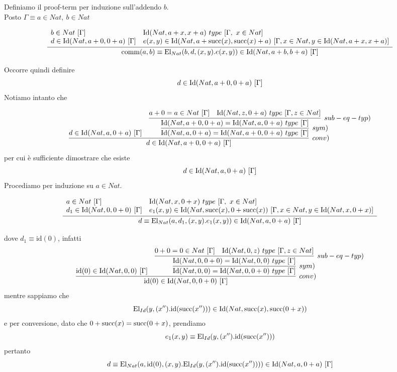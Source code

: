 Definiamo il proof-term per induzione sull'addendo $b$.\\
Posto $\Gamma \equiv a\in Nat,\ b\in Nat$

\begin{scriptsize}
	\[ \infer{\mathrm{comm}(a, b) \equiv \mathrm{El}_{Nat}(b, d, (x, y).e(x,y)) \in \Id{Nat}{a+b}{b+a}\ [\Gamma]}{\begin{array}{ll} b\in Nat\ [\Gamma] & \Id{Nat}{a+x}{x+a}\ type\ [\Gamma,\ x\in Nat] \\ d\in \Id{Nat}{a+0}{0+a}\ [\Gamma] & e(x, y)\in \Id{Nat}{a+\suc{x}}{\suc{x}+a}\ [\Gamma, x\in Nat, y\in \Id{Nat}{a+x}{x+a}]\end{array}} \]
\end{scriptsize}

Occorre quindi definire 
\[ d\in \mathrm{Id}(Nat, a+0, 0+a)\ [\Gamma] \]
Notiamo intanto che

\[ \infer[conv)]{d\in \Id{Nat}{a+0}{0+a}\ [\Gamma]}
{	d\in \Id{Nat}{a}{0+a}\ [\Gamma] & 
	\infer[sym)]{\Id{Nat}{a}{0+a} = \Id{Nat}{a+0}{0+a}\ type\ [\Gamma]}
	{
		\infer[sub-eq-typ)]{\Id{Nat}{a+0}{0+a}=\Id{Nat}{a}{0+a}\ type\ [\Gamma]}
		{a+0 = a\in Nat\ [\Gamma] & \Id{Nat}{z}{0+a}\ type\ [\Gamma, z\in Nat]}
	}
}
\]
per cui è sufficiente dimostrare che esiste
\[ d\in \mathrm{Id}(Nat, a, 0+a)\ [\Gamma]\]
Procediamo per induzione su $a\in Nat$.

\begin{scriptsize}
	\[ \infer{d \equiv \mathrm{El}_{Nat}(a, d_1, (x, y).e_1(x,y)) \in \Id{Nat}{a}{0+a}\ [\Gamma]}{\begin{array}{ll} a\in Nat\ [\Gamma] & \Id{Nat}{x}{0+x}\ type\ [\Gamma,\ x\in Nat] \\ d_1\in \Id{Nat}{0}{0+0}\ [\Gamma] & e_1(x, y)\in \Id{Nat}{\suc{x}}{0+\suc{x}}\ [\Gamma, x\in Nat, y\in \Id{Nat}{x}{0+x}]\end{array}} \]
\end{scriptsize}
dove $d_1 \equiv \mathrm{id}(0)$, infatti
\[ \infer[conv)]{\mathrm{id}(0)\in \Id{Nat}{0}{0+0}\ [\Gamma]}
{	\mathrm{id}(0)\in \Id{Nat}{0}{0}\ [\Gamma] & 
	\infer[sym)]{\Id{Nat}{0}{0} = \Id{Nat}{0}{0+0}\ type\ [\Gamma]}
	{
		\infer[sub-eq-typ)]{\Id{Nat}{0}{0+0}=\Id{Nat}{0}{0}\ type\ [\Gamma]}
		{0+0 = 0\in Nat\ [\Gamma] & \Id{Nat}{0}{z}\ type\ [\Gamma, z\in Nat]}
	}
}
\]
mentre sappiamo che
\[ \mathrm{El}_{Id}(y, (x'').\mathrm{id}(\mathrm{succ}(x''))) \in \mathrm{Id}(Nat, \mathrm{succ}(x), \mathrm{succ}(0+x))\]
e per conversione, dato che $0+\mathrm{succ}(x) = \mathrm{succ}(0+x)$, prendiamo
\[ e_1(x, y) \equiv \mathrm{El}_{Id}(y, (x'').\mathrm{id}(\mathrm{succ}(x''))) \]
pertanto
\[d \equiv \mathrm{El}_{Nat}(a, \mathrm{id}(0), (x, y).\mathrm{El}_{Id}(y, (x'').\mathrm{id}(\mathrm{succ}(x'')))) \in \mathrm{Id}(Nat, a, 0+a)\ [\Gamma]\]


